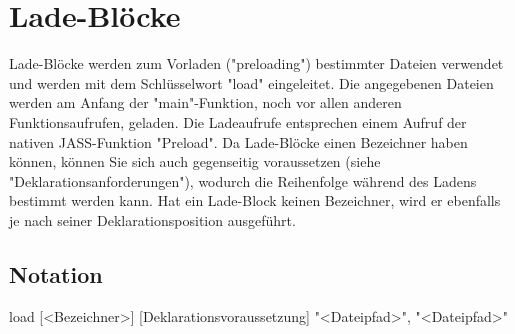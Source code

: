 \chapter{Lade-Blöcke}
Lade-Blöcke werden zum Vorladen ("preloading") bestimmter Dateien verwendet und werden mit dem Schlüsselwort "load" eingeleitet.
Die angegebenen Dateien werden am Anfang der "main"-Funktion, noch vor allen anderen Funktionsaufrufen, geladen.
Die Ladeaufrufe entsprechen einem Aufruf der nativen JASS-Funktion "Preload".
Da Lade-Blöcke einen Bezeichner haben können, können Sie sich auch gegenseitig voraussetzen (siehe "Deklarationsanforderungen"),
wodurch die Reihenfolge während des Ladens bestimmt werden kann.
Hat ein Lade-Block keinen Bezeichner, wird er ebenfalls je nach seiner Deklarationsposition ausgeführt.

\section{Notation}
load [<Bezeichner>] [Deklarationsvoraussetzung]
	"<Dateipfad>",
	"<Dateipfad>"
